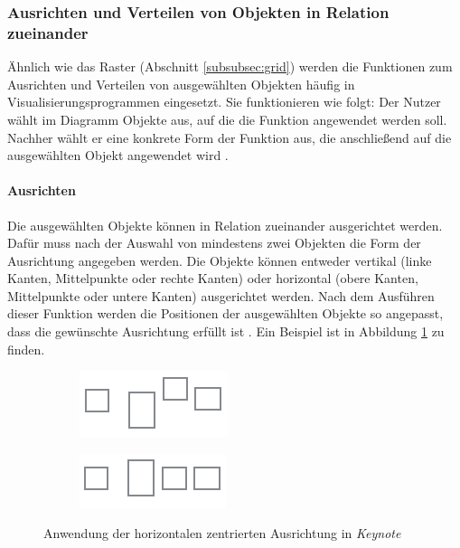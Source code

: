 \subsubsection{Ausrichten und Verteilen von Objekten in Relation zueinander}
\label{subsubsec:alignment-and-distribution}

Ähnlich wie das Raster (Abschnitt \ref{subsubsec:grid}) werden die Funktionen zum Ausrichten und Verteilen von ausgewählten Objekten häufig in Visualisierungsprogrammen eingesetzt. Sie funktionieren wie folgt: Der Nutzer wählt im Diagramm Objekte aus, auf die die Funktion angewendet werden soll. Nachher wählt er eine konkrete Form der Funktion aus, die anschließend auf die ausgewählten Objekt angewendet wird \cite{11Keynote}.

\paragraph{Ausrichten}

Die ausgewählten Objekte können in Relation zueinander ausgerichtet werden. Dafür muss nach der Auswahl von mindestens zwei Objekten die Form der Ausrichtung angegeben werden. Die Objekte können entweder vertikal (linke Kanten, Mittelpunkte oder rechte Kanten) oder horizontal (obere Kanten, Mittelpunkte oder untere Kanten) ausgerichtet werden. Nach dem Ausführen dieser Funktion werden die Positionen der ausgewählten Objekte so angepasst, dass die gewünschte Ausrichtung erfüllt ist \cite{11Keynote, 08OmniGraffle}. Ein Beispiel ist in Abbildung \ref{fig:keynote-horizontal-alignment} zu finden.

\begin{figure}[hbt]
    \newcommand{\subfigurewidth}{0.5\textwidth}
    \begin{subfigure}{\subfigurewidth}
        \centering
        \includegraphics{assets/keynote-horizontal-alignment-a}
        \caption{}
    \end{subfigure}
    \begin{subfigure}{\subfigurewidth}
        \centering
        \includegraphics{assets/keynote-horizontal-alignment-b}
        \caption{}
    \end{subfigure}
    \caption{Anwendung der horizontalen zentrierten Ausrichtung in \textit{Keynote}}
    \label{fig:keynote-horizontal-alignment}
\end{figure}

